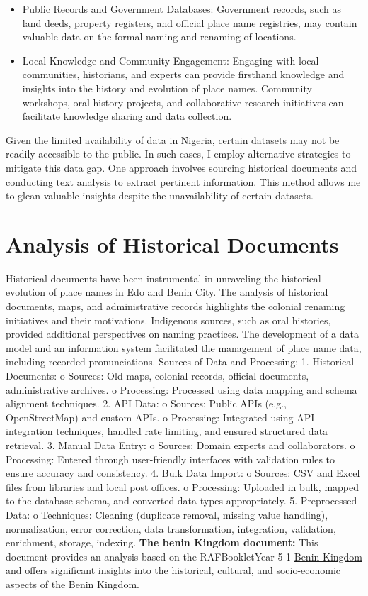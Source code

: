 \begin{itemize}
    \item Public Records and Government Databases: Government records, such as land deeds, property registers, and official place name registries, may contain valuable data on the formal naming and renaming of locations.
    \item Local Knowledge and Community Engagement: Engaging with local communities, historians, and experts can provide firsthand knowledge and insights into the history and evolution of place names. Community workshops, oral history projects, and collaborative research initiatives can facilitate knowledge sharing and data collection.
\end{itemize}

Given the limited availability of data in Nigeria, certain datasets may not be readily accessible to the public. In such cases, I employ alternative strategies to mitigate this data gap. One approach involves sourcing historical documents and conducting text analysis to extract pertinent information. This method allows me to glean valuable insights despite the unavailability of certain datasets.
\section{Analysis of Historical Documents}
Historical documents have been instrumental in unraveling the historical evolution of place names in Edo and Benin City. The analysis of historical documents, maps, and administrative records highlights the colonial renaming initiatives and their motivations. Indigenous sources, such as oral histories, provided additional perspectives on naming practices. The development of a data model and an information system facilitated the management of place name data, including recorded pronunciations.
Sources of Data and Processing:
1.	Historical Documents:
o	Sources: Old maps, colonial records, official documents, administrative archives.
o	Processing: Processed using data mapping and schema alignment techniques.
2.	API Data:
o	Sources: Public APIs (e.g., OpenStreetMap) and custom APIs.
o	Processing: Integrated using API integration techniques, handled rate limiting, and ensured structured data retrieval.
3.	Manual Data Entry:
o	Sources: Domain experts and collaborators.
o	Processing: Entered through user-friendly interfaces with validation rules to ensure accuracy and consistency.
4.	Bulk Data Import:
o	Sources: CSV and Excel files from libraries and local post offices.
o	Processing: Uploaded in bulk, mapped to the database schema, and converted data types appropriately.
5.	Preprocessed Data:
o	Techniques: Cleaning (duplicate removal, missing value handling), normalization, error correction, data transformation, integration, validation, enrichment, storage, indexing.
\textbf{The benin Kingdom document:}
This document provides an analysis based on the RAFBookletYear-5-1 \href{https://denhamgreenacademy.e-act.org.uk/wp-content/uploads/sites/5/2020/10/RAFBookletYear-5-1Benin-Kingdom-paper-size-297x21-cmUPDATED.210187322-wecompress.com_.pdf}{Benin-Kingdom} and offers significant insights into the historical, cultural, and socio-economic aspects of the Benin Kingdom.

